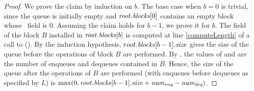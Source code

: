 \sizeCorrectRes*
\begin{proof}
We prove the claim by induction on $b$. 
The base case when ${b=0}$ is trivial, since the queue is initially empty and 
$\mbox{\textnormal{\textit{root}}}.\mbox{\textit{blocks}}[0]$ contains an empty block whose \size\ field is $0$. 
Assuming the claim holds for $b-1$, we prove it for $b$.
The  field of the block $B$ installed in $\mbox{\textnormal{\textit{root}}}.\mbox{\textit{blocks}}[b]$ is computed
at line \ref{computeLength} of a call to ().
By the induction hypothesis, $root.\mbox{\textit{blocks}}[b-1].\mbox{\textit{size}}$ gives the size of the queue before the operations
of block $B$ are performed.
By , the values of  and 
are the number of enqueues and dequeues contained in $B$.
Hence, the size of the queue after the operations of $B$ are performed (with enqueues before dequeues as specified by $L$)
is $\max(0, \mbox{\textnormal{\textit{root}}}.\mbox{\textit{blocks}}[b-1].\mbox{\textit{size}} + \mbox{\textnormal{\textit{num\textsubscript{enq}}}} - \mbox{\textnormal{\textit{num\textsubscript{deq}}}})$.
\end{proof}

